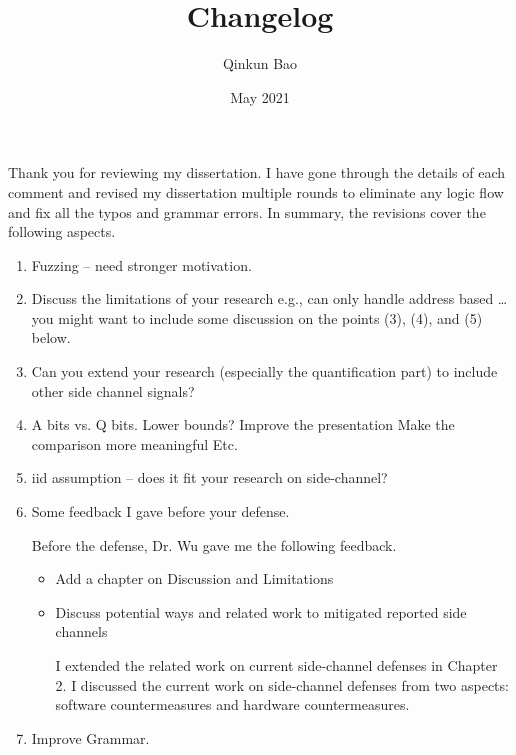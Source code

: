 \documentclass{article}
\title{Changelog}
\author{Qinkun Bao}
\date{May 2021}
\begin{document}
\maketitle
Thank you for reviewing my dissertation. I have gone through the details of each comment and revised my dissertation multiple rounds to eliminate any logic flow and fix all the typos and grammar errors. In summary, the revisions cover the following aspects.


\begin{enumerate}
\item Fuzzing – need stronger motivation.
\item Discuss the limitations of your research
e.g., can only handle address based …
you might want to include some discussion on the points (3), (4), and (5) below.
\item Can you extend your research (especially the quantification part) to include other side channel signals?
\item A bits vs. Q bits. Lower bounds?
       Improve the presentation
       Make the comparison more meaningful
       Etc.
\item iid assumption – does it fit your research on side-channel?
\item Some feedback I gave before your defense.

Before the defense, Dr. Wu gave me the following feedback.
\begin{itemize}
\item Add a chapter on Discussion and Limitations
\item Discuss potential ways and related work to mitigated reported side channels

I extended the related work on current side-channel defenses in Chapter 2. I discussed the current work on side-channel defenses from two aspects: software countermeasures and hardware countermeasures. 
\end{itemize}

\item Improve Grammar.
\end{enumerate}
\end{document}
